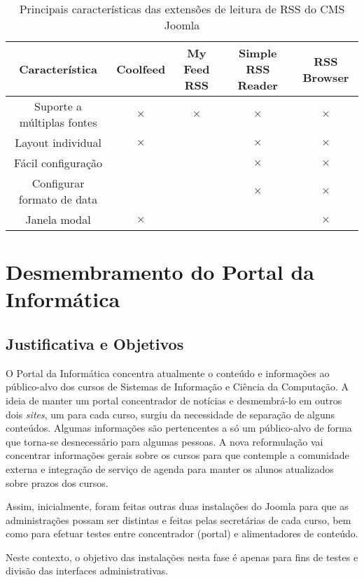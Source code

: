 \newcommand{\x}{$\times$}
\begin{table}
\centering
\begin{tabular}{|c|c|c|c|c|}\hline
Característica & Coolfeed & My Feed RSS & Simple RSS Reader & RSS Browser \\ \hline
Suporte a múltiplas fontes & \x & \x & \x & \x \\ \hline
Layout individual & \x &  &  \x & \x \\ \hline
Fácil configuração &  &  & \x & \x \\ \hline
Configurar formato de data &  &  & \x & \x \\ \hline
Janela modal & \x &  &  & \x  \\ \hline
\end{tabular}
\caption{Principais características das extensões de leitura de RSS do CMS Joomla}
\label{tab}
\end{table}


\section{Desmembramento do Portal da Informática}
\subsection{Justificativa e Objetivos}

O Portal da Informática concentra atualmente o conteúdo e informações ao público-alvo dos cursos de Sistemas de Informação e Ciência da Computação. A ideia de manter um portal concentrador de notícias e desmembrá-lo em outros dois \emph{sites}, um para cada curso, surgiu da necessidade de separação de alguns conteúdos. Algumas informações são pertencentes a só um público-alvo de forma que torna-se desnecessário para algumas pessoas. A nova reformulação vai concentrar informações gerais sobre os cursos para que contemple a comunidade externa e integração de serviço de agenda para manter os alunos atualizados sobre prazos dos cursos. 

Assim, inicialmente, foram feitas outras duas instalações do Joomla para que as administrações possam ser distintas e feitas pelas secretárias de cada curso, bem como para efetuar testes entre concentrador (portal) e alimentadores de conteúdo.

Neste contexto, o objetivo das instalações nesta fase é apenas para fins de testes e divisão das interfaces administrativas.

